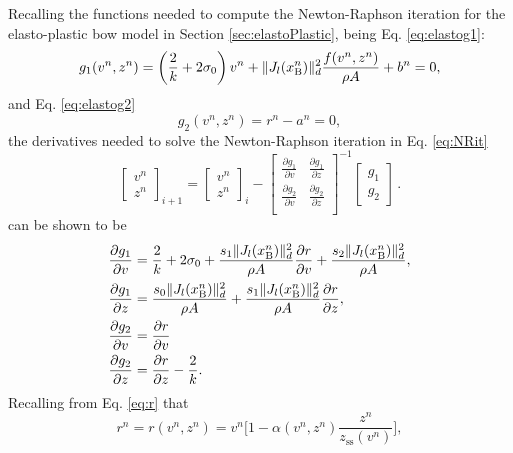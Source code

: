 Recalling the functions needed to compute the Newton-Raphson iteration for the elasto-plastic bow model in Section \ref{sec:elastoPlastic}, being Eq. \eqref{eq:elastog1}:
\begin{equation*}
    g_1(v^n,z^n) = \left(\frac{2}{k} + 2\sigma_{0}\right)v^n + \lVert J_l(x_{\text{B}}^n)\rVert_d^2\frac{f(v^n,z^n)}{\rho A}+ b^n= 0,
\end{equation*}
and Eq. \eqref{eq:elastog2}
\begin{equation*}
    g_2(v^n, z^n) = r^n - a^n = 0,
\end{equation*}
the derivatives needed to solve the Newton-Raphson iteration in Eq. \eqref{eq:NRit} 
\begin{equation*}
    \begin{bmatrix}
        v^n\\
        z^n
        \end{bmatrix}_{i+1}
        =
        \begin{bmatrix}
        v^n\\
        z^n
        \end{bmatrix}_i
        -
        \begin{bmatrix}
        \frac{\partial g_1}{\partial v} & \frac{\partial g_1}{\partial z}\\
        \frac{\partial g_2}{\partial v} & \frac{\partial g_2}{\partial z}\\
        \end{bmatrix}^{-1}
        \begin{bmatrix}
        g_1\\
        g_2
        \end{bmatrix}\,
        .
\end{equation*}
can be shown to be
\begin{align*}
    \frac{\partial g_1}{\partial v} &= \frac{2}{k} + 2\sigma_0 + \frac{s_1\lVert J_l(x_{\text{B}}^n)\rVert_d^2}{\rho A}\frac{\partial r}{\partial v}+\frac{s_2\lVert J_l(x_{\text{B}}^n)\rVert_d^2}{\rho A},\\
    \frac{\partial g_1}{\partial z} &= \frac{s_0\lVert J_l(x_{\text{B}}^n)\rVert_d^2}{\rho A} + \frac{s_1\lVert J_l(x_{\text{B}}^n)\rVert_d^2}{\rho A}\frac{\partial r}{\partial z},\\
    \frac{\partial g_2}{\partial v} &= \frac{\partial r}{\partial v}
    \\\frac{\partial g_2}{\partial z}&= \frac{\partial r}{\partial z} -\frac{2}{k}.
\end{align*}
Recalling from Eq. \eqref{eq:r} that
\begin{equation*}
    r^n = r(v^n,z^n) = v^n\bigg[1-\alpha(v^n,z^n)\frac{z^n}{z_\text{ss}(v^n)}\bigg],
\end{equation*}
